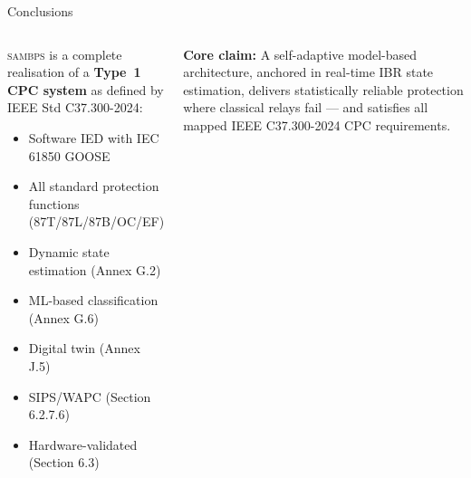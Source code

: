 \documentclass[aspectratio=169, 10pt]{beamer}
\newcommand{\SAMBPS}{\textsc{sambps}}
\begin{document}
\begin{frame}{Conclusions}
\begin{columns}[T]
\vspace{8pt}
\begin{tcolorbox}[cpcbox, title={SAMBPS as a CPC System}]
{\small \SAMBPS{} is a complete realisation of a
\textbf{Type~1 CPC system} as defined by IEEE Std C37.300-2024:
\begin{itemize}\setlength\itemsep{2pt}
  \item Software IED with IEC 61850 GOOSE
  \item All standard protection functions (87T/87L/87B/OC/EF)
  \item Dynamic state estimation (Annex G.2)
  \item ML-based classification (Annex G.6)
  \item Digital twin (Annex J.5)
  \item SIPS/WAPC (Section 6.2.7.6)
  \item Hardware-validated (Section 6.3)
\end{itemize}}
\end{tcolorbox}
\vspace{6pt}
{\small\textbf{Core claim:} A self-adaptive model-based architecture,
anchored in real-time IBR state estimation, delivers
statistically reliable protection where classical relays fail ---
and satisfies all mapped IEEE C37.300-2024 CPC requirements.}
\end{columns}
\end{frame}
\end{document}
